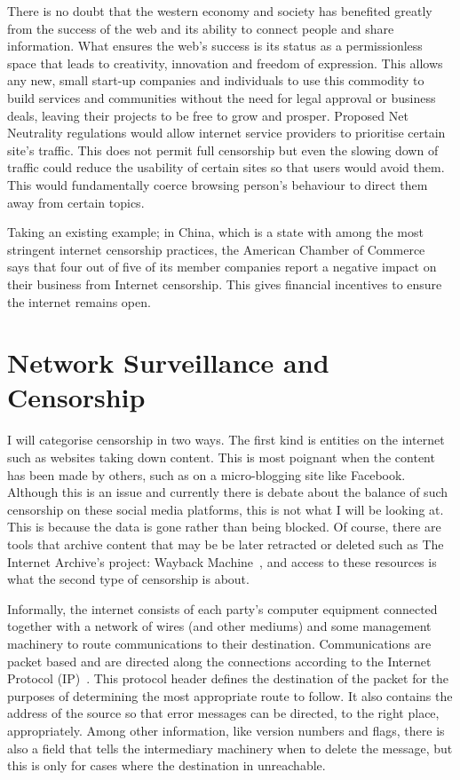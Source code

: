 \documentclass[ %
                    author={Samuel Russell},
                supervisor={Prof. Bogdan Warinschi},
                    degree={MEng},
                     title={Innocuous Ciphertexts},
                  subtitle={The DE-CENSOR Scheme},
                      type={research},
                      year={2018} ]{dissertation}
\begin{document}
There is no doubt that the western economy and society has benefited greatly from the success of the web and its ability to connect people and share information. What ensures the web's success is its status as a permissionless space that leads to creativity, innovation and freedom of expression. This allows any new, small start-up companies and individuals to use this commodity to build services and communities without the need for legal approval or business deals, leaving their projects to be free to grow and prosper. Proposed Net Neutrality regulations would allow internet service providers to prioritise certain site's traffic. This does not permit full censorship but even the slowing down of traffic could reduce the usability of certain sites so that users would avoid them. This would fundamentally coerce browsing person's behaviour to direct them away from certain topics.

Taking an existing example; in China, which is a state with among the most stringent internet censorship practices, the American Chamber of Commerce~\cite{amcham} says that four out of five of its member companies report a negative impact on their business from Internet censorship. This gives financial incentives to ensure the internet remains open.

\section{Network Surveillance and Censorship}

I will categorise censorship in two ways. The first kind is entities on the internet such as websites taking down content. This is most poignant when the content has been made by others, such as on a micro-blogging site like Facebook. Although this is an issue and currently there is debate about the balance of such censorship on these social media platforms, this is not what I will be looking at. This is because the data is gone rather than being blocked. Of course, there are tools that archive content that may be be later retracted or deleted such as The Internet Archive's project: Wayback Machine~\cite{wb}, and access to these resources is what the second type of censorship is about.

Informally, the internet consists of each party's computer equipment connected together with a network of wires (and other mediums) and some management machinery to route communications to their destination.
Communications are packet based and are directed along the connections according to the Internet Protocol (IP)~\cite{ip4}.
This protocol header defines the destination of the packet for the purposes of determining the most appropriate route to follow.
It also contains the address of the source so that error messages can be directed, to the right place, appropriately.
Among other information, like version numbers and flags, there is also a field that tells the intermediary machinery when to delete the message, but this is only for cases where the destination in unreachable. 
\end{document}
